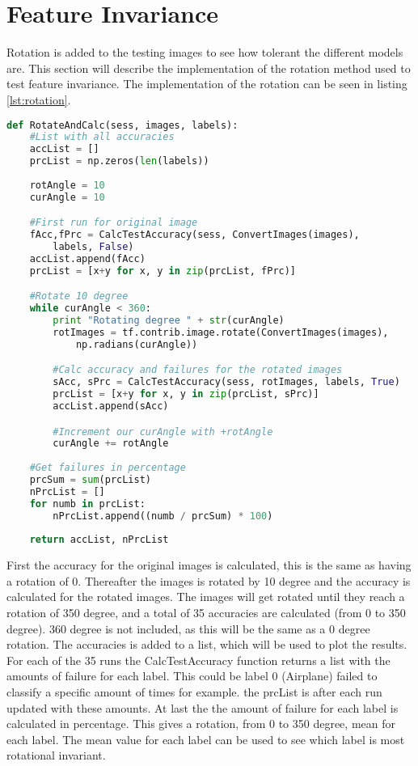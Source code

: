 \section{Feature Invariance}

Rotation is added to the testing images to see how tolerant the different models are. This section will describe the implementation of the rotation method used to test feature invariance. The implementation of the rotation can be seen in listing \ref{lst:rotation}.

\begin{lstlisting}[language=Python, label=lst:rotation, caption=Rotate the images and calculate the accuracy]
def RotateAndCalc(sess, images, labels):
    #List with all accuracies
    accList = []
    prcList = np.zeros(len(labels))
    
    rotAngle = 10
    curAngle = 10

    #First run for original image
    fAcc,fPrc = CalcTestAccuracy(sess, ConvertImages(images),
	 	labels, False)
    accList.append(fAcc)
    prcList = [x+y for x, y in zip(prcList, fPrc)]

    #Rotate 10 degree
    while curAngle < 360:
        print "Rotating degree " + str(curAngle)
        rotImages = tf.contrib.image.rotate(ConvertImages(images), 
			np.radians(curAngle))

        #Calc accuracy and failures for the rotated images
        sAcc, sPrc = CalcTestAccuracy(sess, rotImages, labels, True)
        prcList = [x+y for x, y in zip(prcList, sPrc)]
        accList.append(sAcc)

        #Increment our curAngle with +rotAngle
        curAngle += rotAngle
       
    #Get failures in percentage
    prcSum = sum(prcList)
    nPrcList = []
    for numb in prcList:
        nPrcList.append((numb / prcSum) * 100)
    
    return accList, nPrcList
\end{lstlisting}

First the accuracy for the original images is calculated, this is the same as having a rotation of 0. Thereafter the images is rotated by 10 degree and the accuracy is calculated for the rotated images. The images will get rotated until they reach a rotation of 350 degree, and a total of 35 accuracies are calculated (from 0 to 350 degree). 360 degree is not included, as this will be the same as a 0 degree rotation. The accuracies is added to a list, which will be used to plot the results. For each of the 35 runs the CalcTestAccuracy function returns a list with the amounts of failure for each label. This could be label 0 (Airplane) failed to classify a specific amount of times for example. the prcList is after each run updated with these amounts. At last the the amount of failure for each label is calculated in percentage. This gives a rotation, from 0 to 350 degree, mean for each label. The mean value for each label can be used to see which label is most rotational invariant.
\newline

